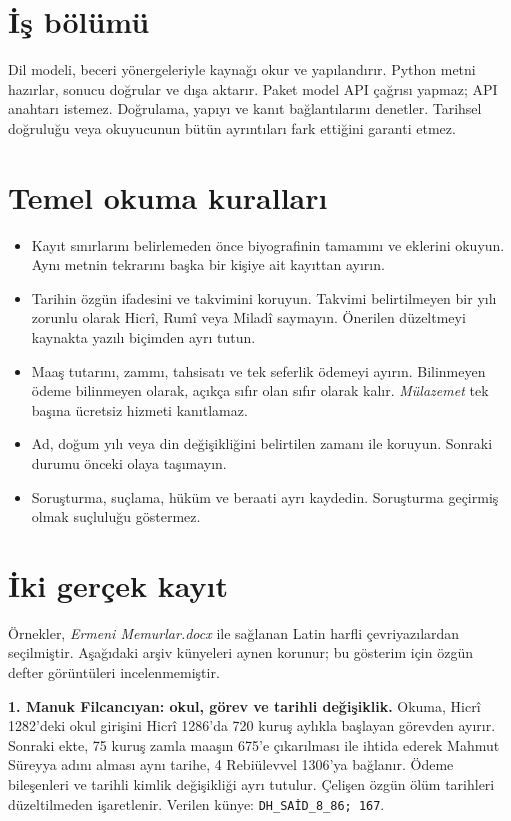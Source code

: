 \documentclass[11pt,a4paper]{article}
\begin{document}
\section{İş bölümü}
Dil modeli, beceri yönergeleriyle kaynağı okur ve yapılandırır. Python metni hazırlar, sonucu doğrular ve dışa aktarır. Paket model API çağrısı yapmaz; API anahtarı istemez. Doğrulama, yapıyı ve kanıt bağlantılarını denetler. Tarihsel doğruluğu veya okuyucunun bütün ayrıntıları fark ettiğini garanti etmez.

\newpage
\section{Temel okuma kuralları}
\begin{itemize}
\item Kayıt sınırlarını belirlemeden önce biyografinin tamamını ve eklerini okuyun. Aynı metnin tekrarını başka bir kişiye ait kayıttan ayırın.
\item Tarihin özgün ifadesini ve takvimini koruyun. Takvimi belirtilmeyen bir yılı zorunlu olarak Hicrî, Rumî veya Miladî saymayın. Önerilen düzeltmeyi kaynakta yazılı biçimden ayrı tutun.
\item Maaş tutarını, zammı, tahsisatı ve tek seferlik ödemeyi ayırın. Bilinmeyen ödeme bilinmeyen olarak, açıkça sıfır olan sıfır olarak kalır. \emph{Mülazemet} tek başına ücretsiz hizmeti kanıtlamaz.
\item Ad, doğum yılı veya din değişikliğini belirtilen zamanı ile koruyun. Sonraki durumu önceki olaya taşımayın.
\item Soruşturma, suçlama, hüküm ve beraati ayrı kaydedin. Soruşturma geçirmiş olmak suçluluğu göstermez.
\end{itemize}

\section{İki gerçek kayıt}
Örnekler, \emph{Ermeni Memurlar.docx} ile sağlanan Latin harfli çevriyazılardan seçilmiştir. Aşağıdaki arşiv künyeleri aynen korunur; bu gösterim için özgün defter görüntüleri incelenmemiştir.

\textbf{1. Manuk Filcancıyan: okul, görev ve tarihli değişiklik.}
Okuma, Hicrî 1282'deki okul girişini Hicrî 1286'da 720 kuruş aylıkla başlayan görevden ayırır. Sonraki ekte, 75 kuruş zamla maaşın 675'e çıkarılması ile ihtida ederek Mahmut Süreyya adını alması aynı tarihe, 4 Rebiülevvel 1306'ya bağlanır. Ödeme bileşenleri ve tarihli kimlik değişikliği ayrı tutulur. Çelişen özgün ölüm tarihleri düzeltilmeden işaretlenir. Verilen künye: \texttt{DH\_SAİD\_8\_86; 167}.
\end{document}
